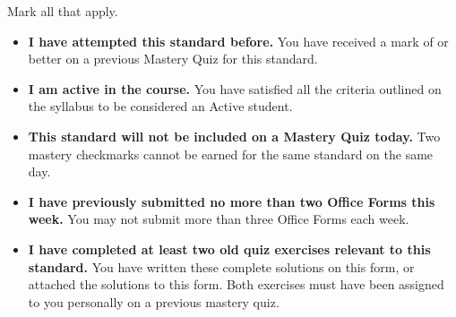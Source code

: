 \documentclass[12pt]{article}
\newcommand{\issuesMark}{{\fontencoding{U}\fontfamily{futs}\selectfont\char 66\relax}}
\begin{document}

\vspace{1em}



\renewcommand\labelitemi{\(\square\)}
Mark all that apply.
\begin{itemize}
  \item \textbf{I have attempted this standard before.}
        You have received a mark of \issuesMark{} or better on a previous Mastery Quiz
        for this standard.
  \item \textbf{I am active in the course.}
        You have satisfied all the criteria outlined on the syllabus to be
        considered an Active student.
  \item \textbf{This standard will not be included on a Mastery Quiz today.}
        Two mastery checkmarks cannot be earned for the same standard on the same day.
  \item \textbf{I have previously submitted no more than two Office Forms this week.}
        You may not submit more than three Office Forms each week.
  \item \textbf{I have completed at least two old quiz exercises
        relevant to this standard.}
        You have written these complete solutions on this form, or attached the solutions
        to this form. Both exercises must have been assigned to you personally
        on a previous mastery quiz.
\end{itemize}
\end{document}

